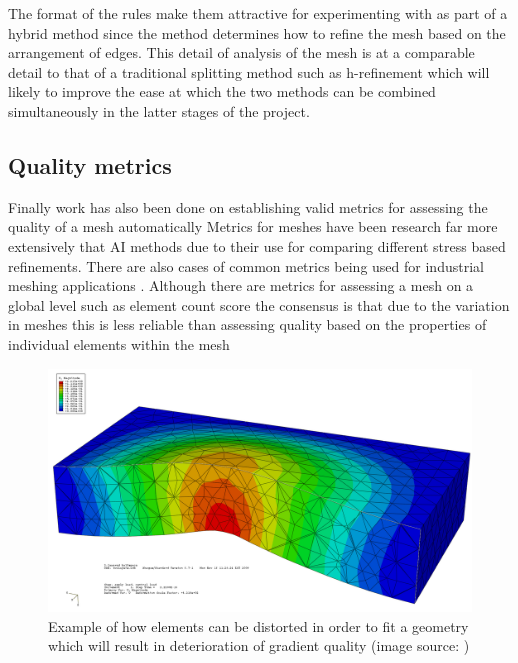 \documentclass{article}
\begin{document}
\noindent
The format of the rules make them attractive for experimenting with as part of a hybrid method since the method determines how to refine the mesh based on the arrangement of edges. This detail of analysis of the mesh is at a comparable detail to that of a traditional splitting method such as h-refinement which will likely to improve the ease at which the two methods can be combined simultaneously in the latter stages of the project. \\ 

\subsection{Quality metrics}
\noindent
Finally work has also been done on establishing valid metrics for assessing the quality of a mesh automatically \cite{DittmerMeshQualityMet, NeuralNetworks} Metrics for meshes have been research far more extensively that AI methods due to their use for comparing different stress based refinements. There are also cases of common metrics being used for industrial meshing applications \cite{DittmerMeshQualityMet}. Although there are metrics for assessing a mesh on a global level such as element count score \cite{DittmerMeshQualityMet} the consensus is that due to the variation in meshes this is less reliable than assessing quality based on the properties of individual elements within the mesh \cite{DittmerMeshQualityMet} \\

\begin{figure}[!h]
  \centerline{\includegraphics[width=120mm, scale=1]{MeshQualityDeterioration.png}}
  \caption{Example of how elements can be distorted in order to fit a geometry which will result in deterioration of gradient quality (image source: \cite{PoorFEElementShapes})}
\end{figure}
\end{document}
